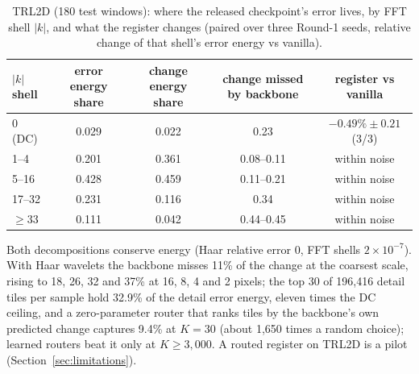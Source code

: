\documentclass{article}
\begin{document}
\begin{table}[h]
\centering
\caption{TRL2D (180 test windows): where the released checkpoint's error lives, by FFT shell $|k|$, and what the
register changes (paired over three Round-1 seeds, relative change of that shell's error energy vs vanilla).}
\label{tab:bands}
\small
\begin{tabular}{lcccc}
\toprule
$|k|$ shell & error energy share & change energy share & change missed by backbone & register vs vanilla \\
\midrule
0 (DC) & 0.029 & 0.022 & 0.23 & $-0.49\% \pm 0.21$ (3/3) \\
1--4 & 0.201 & 0.361 & 0.08--0.11 & within noise \\
5--16 & 0.428 & 0.459 & 0.11--0.21 & within noise \\
17--32 & 0.231 & 0.116 & 0.34 & within noise \\
$\ge$33 & 0.111 & 0.042 & 0.44--0.45 & within noise \\
\bottomrule
\end{tabular}
\end{table}




Both decompositions conserve energy (Haar relative error 0, FFT shells $2{\times}10^{-7}$). With Haar wavelets the
backbone misses 11\% of the change at the coarsest scale, rising to 18, 26, 32 and 37\% at 16, 8, 4 and 2 pixels; the
top 30 of 196{,}416 detail tiles per sample hold 32.9\% of the detail error energy, eleven times the DC ceiling, and a
zero-parameter router that ranks tiles by the backbone's own predicted change captures 9.4\% at $K{=}30$ (about 1{,}650
times a random choice); learned routers beat it only at $K \ge 3{,}000$. A routed register on TRL2D is a pilot
(Section~\ref{sec:limitations}).

\label{app:lean}
\end{document}
